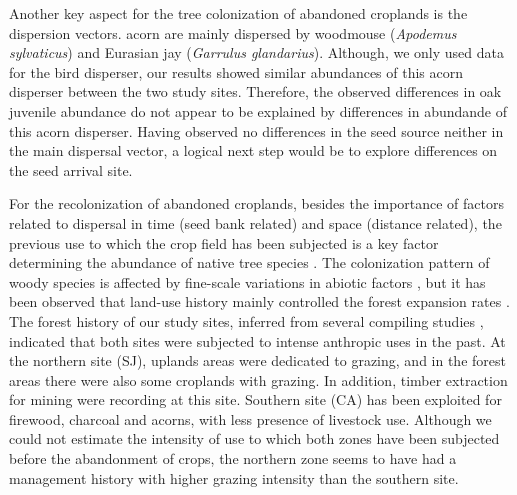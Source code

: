 Another key aspect for the tree colonization of abandoned croplands is the dispersion vectors. \Qp acorn are mainly dispersed by woodmouse (\emph{Apodemus sylvaticus}) and Eurasian jay (\emph{Garrulus glandarius})\autocites{Gomez2003ImpactVertebrate,Pereaetal2014InteraccionesPlantaanimal}. Although, we only used data for the bird disperser, our results showed similar abundances of this acorn disperser between the two study sites. Therefore, the observed differences in oak juvenile abundance do not appear to be explained by differences in abundande of this acorn disperser. Having observed no differences in the seed source neither in the main dispersal vector, a logical next step would be to explore differences on the seed arrival site. 

For the recolonization of abandoned croplands, besides the importance of factors related to dispersal in time (seed bank related) and space (distance related), the previous use to which the crop field has been subjected is a key factor determining the abundance of native tree species \autocites{HermyVerheyen2007LegaciesPresentday,NavarroGonzalezetal2013WeightLanduse}. The colonization pattern of woody species is affected by fine-scale variations in abiotic factors \autocite{Milderetal2013ColonizationPatterns,Leverkusetal2016ShiftingDemographic}, but it has been observed that land-use history mainly controlled the forest expansion rates \autocites{AlvarezMartinezetal2014InfluenceLand,Perringetal2016GlobalEnvironmental}. The forest history of our study sites, inferred from several compiling studies \autocites{MorenoLlorcaetal2014CaracterizacionFuentes, Titos1997, PerezLuqueetal2020LanduseLegacies,MorenoLlorcaetal2016HistoricalAnalysis,MesaTorres2009,JimenezOlivenciaetal2015EvolucionUsos}, indicated that both sites were subjected to intense anthropic uses in the past. At the northern site (SJ), uplands areas were dedicated to grazing, and in the forest areas there were also some croplands with grazing. In addition, timber extraction for mining were recording at this site. Southern site (CA) has been exploited for firewood, charcoal and acorns, with less presence of livestock use. Although we could not estimate the intensity of use to which both zones have been subjected before the abandonment of crops, the northern zone seems to have had a management history with higher grazing intensity than the southern site. 
